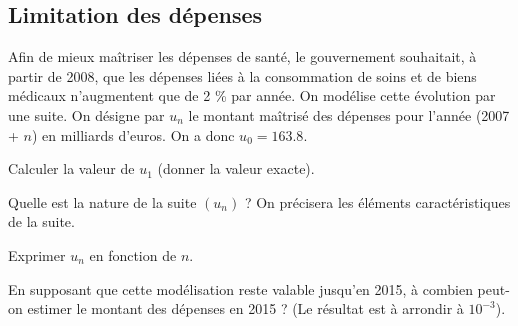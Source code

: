 \subsection{Limitation des dépenses}

Afin de mieux maîtriser les dépenses de santé, le gouvernement souhaitait, à partir de 2008, que les dépenses liées à la consommation de soins et de biens médicaux n'augmentent que de 2 \% par année. On modélise cette évolution par une suite. On désigne par $u_n$ le montant maîtrisé des dépenses pour l'année (2007 + $n$) en milliards d'euros. On a donc $u_0 = \num{163.8}$.

\begin{questions}
	\question[1] Calculer la valeur de $u_1$ (donner la valeur exacte). 
	
	\question[1] Quelle est la nature de la suite $(u_n)$ ? On précisera les éléments caractéristiques de la suite.
	
	\question[1] Exprimer $u_n$ en fonction de $n$.
	
	\question[1] En supposant que cette modélisation reste valable jusqu'en 2015, à combien peut-on estimer le montant des dépenses en 2015 ? (Le résultat est à arrondir à $10^{-3}$).
\end{questions}

  